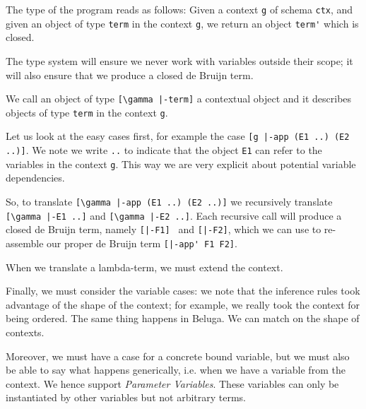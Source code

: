 The type of the program reads as follows: Given a context
\lstinline!g! of schema \lstinline!ctx!, and given an object of type
\lstinline!term! in the context \lstinline!g!, we return an object
\lstinline!term'! which is closed.

The type system will ensure we never work with variables outside their
scope; it will also ensure that we produce a closed de Bruijn term.

We call an object of type \lstinline![\gamma |-term]! a contextual object and
it describes objects of type \lstinline!term! in the context
\lstinline!g!.

Let us look at the easy cases first, for example the case
\lstinline![g |-app (E1 ..) (E2 ..)]!.  We note we write \lstinline!..!
to indicate that the object \lstinline!E1! can refer to the variables
in the context \lstinline!g!. This way we are very explicit about
potential variable dependencies.

So, to translate \lstinline![\gamma |-app (E1 ..) (E2 ..)]! we recursively
translate \lstinline![\gamma |-E1 ..]! and \lstinline![\gamma |-E2 ..]!. Each
recursive call will produce a closed de Bruijn term, namely
\lstinline![|-F1] ! and \lstinline![|-F2]!, which we can use to
re-assemble our proper de Bruijn term \lstinline![|-app' F1 F2]!.

When we translate a lambda-term, we must extend the context.


Finally, we must consider the variable cases: we note that the
inference rules took advantage of the shape of the context; for
example, we really took the context for being ordered. The same thing
happens in Beluga. We can match on the shape of contexts.


Moreover, we must have a case for a concrete bound variable, but we
must also be able to say what happens generically, i.e. when we have a
variable from the context. We hence support \emph{Parameter
  Variables}. These variables can only be instantiated by other
variables but not arbitrary terms.



